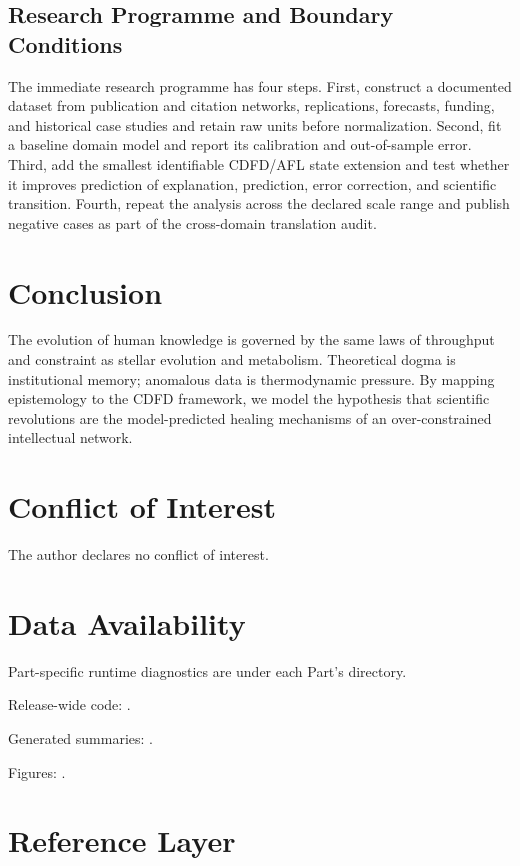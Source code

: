 \documentclass[11pt,a4paper]{article}
\begin{document}
\subsection{Research Programme and Boundary Conditions}

The immediate research programme has four steps. First, construct a documented
dataset from publication and citation networks, replications, forecasts, funding, and historical case studies and retain raw units before normalization.
Second, fit a baseline domain model and report its calibration and out-of-sample
error. Third, add the smallest identifiable CDFD/AFL state extension and test
whether it improves prediction of explanation, prediction, error correction, and scientific transition. Fourth, repeat the
analysis across the declared scale range and publish negative cases as part of
the cross-domain translation audit.


\section{Conclusion}
The evolution of human knowledge is governed by the same laws of throughput and constraint as stellar evolution and metabolism. Theoretical dogma is institutional memory; anomalous data is thermodynamic pressure. By mapping epistemology to the CDFD framework, we model the hypothesis that scientific revolutions are the model-predicted healing mechanisms of an over-constrained intellectual network.
\section*{Conflict of Interest} The author declares no conflict of interest.
\section*{Data Availability}
Part-specific runtime diagnostics are under each Part's  directory.

Release-wide code: .

Generated summaries: .

Figures: .


\section{Reference Layer}


\end{document}
